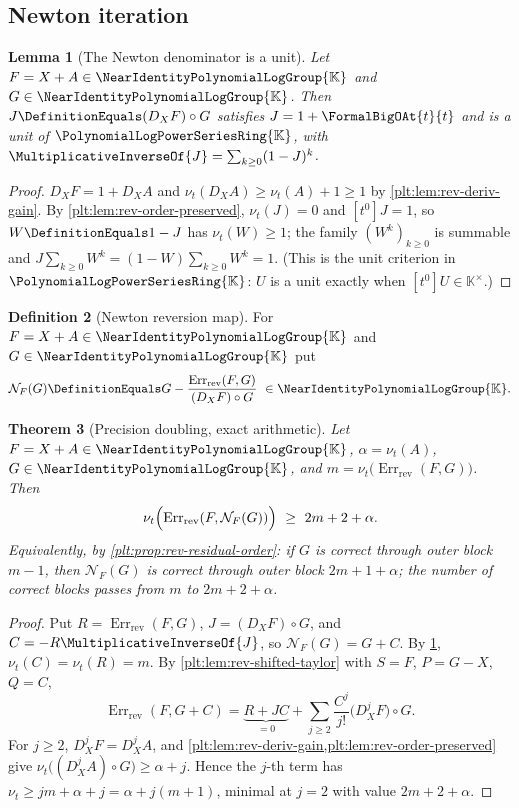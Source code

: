 \documentclass[11pt,oneside]{article}
\theoremstyle{plain}
\newtheorem{theorem}{Theorem}[section]
\newtheorem{lemma}[theorem]{Lemma}
\theoremstyle{definition}
\newtheorem{definition}[theorem]{Definition}
\theoremstyle{remark}
\newcommand{\K}{\mathbb{K}}
\newcommand{\PLpow}{\PolynomialLogPowerSeriesRing{\K}}   %
\newcommand{\Gnear}{\NearIdentityPolynomialLogGroup{\K}} %
\newcommand{\ordt}{\nu_{t}}                              %
\newcommand{\DX}{D_{X}}                                  %
\newcommand{\compose}{\mathbin{\circ}}
\newcommand{\RevErr}[2]{\operatorname{Err}_{\mathrm{rev}}\!\left(#1,#2\right)}
\begin{document}
\subsection{Newton iteration}
\label{plt:sec:rev-newton}

\begin{lemma}[The Newton denominator is a unit]
\label{plt:lem:rev-newton-unit}
Let \(F=X+A\in\Gnear\) and \(G\in\Gnear\).  Then
\(J\DefinitionEquals(\DX F)\compose G\) satisfies \(J=1+\FormalBigOAt{t}{t}\)
and is a unit of \(\PLpow\), with
\(\MultiplicativeInverseOf{J}=\sum_{k\ge0}(1-J)^k\).
\end{lemma}

\begin{proof}
\(\DX F=1+\DX A\) and \(\ordt(\DX A)\ge\ordt(A)+1\ge1\) by
\cref{plt:lem:rev-deriv-gain}.  By \cref{plt:lem:rev-order-preserved},
\(\ordt(J)=0\) and \([t^0]J=1\), so \(W\DefinitionEquals1-J\) has
\(\ordt(W)\ge1\); the family \((W^k)_{k\ge0}\) is summable and
\(J\sum_{k\ge0}W^k=(1-W)\sum_{k\ge0}W^k=1\).  (This is the unit criterion in
\(\PLpow\): \(U\) is a unit exactly when \([t^0]U\in\K^\times\).)
\end{proof}

\begin{definition}[Newton reversion map]
\label{plt:def:rev-newton}
For \(F=X+A\in\Gnear\) and \(G\in\Gnear\) put
\begin{equation}\label{plt:eq:rev-newton}
 \mathcal N_F(G)\DefinitionEquals
 G-\frac{\RevErr{F}{G}}{(\DX F)\compose G}\ \in\Gnear .
\end{equation}
\end{definition}

\begin{theorem}[Precision doubling, exact arithmetic]
\label{plt:thm:rev-newton-doubling}
Let \(F=X+A\in\Gnear\), \(\alpha=\ordt(A)\), \(G\in\Gnear\), and
\(m=\ordt\bigl(\RevErr{F}{G}\bigr)\).  Then
\begin{equation}\label{plt:eq:rev-newton-doubling}
 \ordt\Bigl(\RevErr{F}{\mathcal N_F(G)}\Bigr)\ \ge\ 2m+2+\alpha .
\end{equation}
Equivalently, by \cref{plt:prop:rev-residual-order}: if \(G\) is correct through
outer block \(m-1\), then \(\mathcal N_F(G)\) is correct through outer block
\(2m+1+\alpha\); the number of correct blocks passes from \(m\) to
\(2m+2+\alpha\).
\end{theorem}

\begin{proof}
Put \(R=\RevErr{F}{G}\), \(J=(\DX F)\compose G\), and
\(C=-R\MultiplicativeInverseOf{J}\), so \(\mathcal N_F(G)=G+C\).  By
\cref{plt:lem:rev-newton-unit}, \(\ordt(C)=\ordt(R)=m\).  By
\cref{plt:lem:rev-shifted-taylor} with \(S=F\), \(P=G-X\), \(Q=C\),
\[
 \RevErr{F}{G+C}
 =\underbrace{R+JC}_{=0}
 +\sum_{j\ge2}\frac{C^j}{j!}\bigl(\DX^jF\bigr)\compose G .
\]
For \(j\ge2\), \(\DX^jF=\DX^jA\), and
\cref{plt:lem:rev-deriv-gain,plt:lem:rev-order-preserved} give
\(\ordt\bigl((\DX^jA)\compose G\bigr)\ge\alpha+j\).  Hence the \(j\)-th term
has \(\ordt\ge jm+\alpha+j=\alpha+j(m+1)\), minimal at \(j=2\) with value
\(2m+2+\alpha\).
\end{proof}
\end{document}
